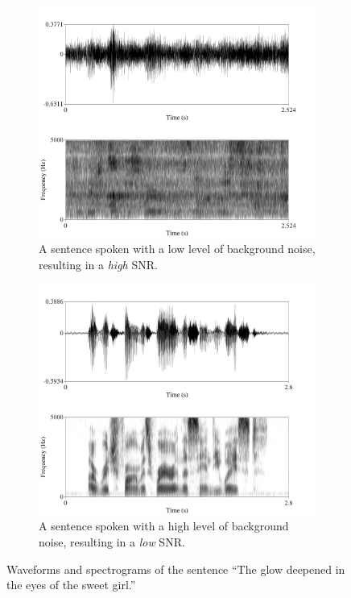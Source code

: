\begin{figure}[H]
\centering
\begin{subfigure}{\textwidth}
\centering
  \includegraphics[width=.8\textwidth]{figure/signal-SNR-intro-low.png}
  \caption{A sentence spoken with a low level of background noise, resulting in a \textit{high} SNR.}
  \label{fig:signal-SNR-intro-high}
\end{subfigure}
%
\begin{subfigure}{\textwidth}
\centering
  \includegraphics[width=.8\textwidth]{figure/signal-SNR-intro-high.png}
  \caption{A sentence spoken with a high level of background noise, resulting in a \textit{low} SNR.}
  \label{fig:signal-SNR-intro-low}
\end{subfigure}
\caption{Waveforms and spectrograms of the sentence ``The glow deepened in the eyes of the sweet girl.''}
\label{fig:signal-SNR-intro}
\end{figure}

